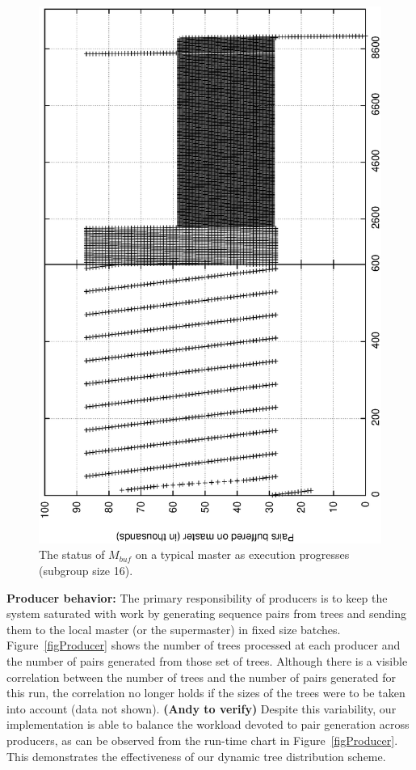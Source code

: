 \documentclass[10pt,journal,letterpaper,compsoc]{IEEEtran}
\begin{document}
\begin{figure}[thb]
\centerline{
						\includegraphics[angle=-90, scale=0.33]{Group.pBuf.eps}
            }
\caption{
The status of $M_{buf}$ on a typical master as execution progresses (subgroup size 16). 
}
\label{figMBuffer}
\end{figure}

{\bf Producer behavior:} The primary responsibility of producers is to keep the system saturated with work by generating sequence pairs from trees and sending them to the local master (or the supermaster) in fixed size batches. Figure~\ref{figProducer} shows the number of trees processed at each producer and the number of pairs generated from those set of trees. Although there is a visible correlation between the number of trees and the number of pairs generated for this run, the correlation no longer holds if the sizes of the trees were to be taken into account (data not shown). {\bf (Andy to verify)} Despite this variability, our implementation is able to balance the workload devoted to pair generation across producers, as can be observed from the run-time chart in Figure~\ref{figProducer}. This demonstrates the effectiveness of our dynamic tree distribution scheme. 
\end{document}
